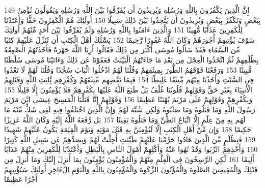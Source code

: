 {\tiny\colorbox{cl_aya}{149}} إِنَّ الَّذِينَ يَكْفُرُونَ بِاللَّهِ وَرُسُلِهِ وَيُرِيدُونَ أَن يُفَرِّقُوا بَيْنَ اللَّهِ وَرُسُلِهِ وَيَقُولُونَ نُؤْمِنُ بِبَعْضٍ وَنَكْفُرُ بِبَعْضٍ وَيُرِيدُونَ أَن يَتَّخِذُوا بَيْنَ ذَلِكَ سَبِيلًا
{\tiny\colorbox{cl_aya}{150}} أُولَئِكَ هُمُ الْكَفِرُونَ حَقًّا وَأَعْتَدْنَا لِلْكَفِرِينَ عَذَابًا مُّهِينًا
{\tiny\colorbox{cl_aya}{151}} وَالَّذِينَ ءَامَنُوا بِاللَّهِ وَرُسُلِهِ وَلَمْ يُفَرِّقُوا بَيْنَ أَحَدٍ مِّنْهُمْ أُولَئِكَ سَوْفَ يُؤْتِيهِمْ أُجُورَهُمْ وَكَانَ اللَّهُ غَفُورًا رَّحِيمًا
{\tiny\colorbox{cl_aya}{152}} يَسَْٔلُكَ أَهْلُ الْكِتَبِ أَن تُنَزِّلَ عَلَيْهِمْ كِتَبًا مِّنَ السَّمَاءِ فَقَدْ سَأَلُوا مُوسَى أَكْبَرَ مِن ذَلِكَ فَقَالُوا أَرِنَا اللَّهَ جَهْرَةً فَأَخَذَتْهُمُ الصَّعِقَةُ بِظُلْمِهِمْ ثُمَّ اتَّخَذُوا الْعِجْلَ مِن بَعْدِ مَا جَاءَتْهُمُ الْبَيِّنَتُ فَعَفَوْنَا عَن ذَلِكَ وَءَاتَيْنَا مُوسَى سُلْطَنًا مُّبِينًا
{\tiny\colorbox{cl_aya}{153}} وَرَفَعْنَا فَوْقَهُمُ الطُّورَ بِمِيثَقِهِمْ وَقُلْنَا لَهُمُ ادْخُلُوا الْبَابَ سُجَّدًا وَقُلْنَا لَهُمْ لَا تَعْدُوا فِى السَّبْتِ وَأَخَذْنَا مِنْهُم مِّيثَقًا غَلِيظًا
{\tiny\colorbox{cl_aya}{154}} فَبِمَا نَقْضِهِم مِّيثَقَهُمْ وَكُفْرِهِم بَِٔايَتِ اللَّهِ وَقَتْلِهِمُ الْأَنبِيَاءَ بِغَيْرِ حَقٍّ وَقَوْلِهِمْ قُلُوبُنَا غُلْفٌ بَلْ طَبَعَ اللَّهُ عَلَيْهَا بِكُفْرِهِمْ فَلَا يُؤْمِنُونَ إِلَّا قَلِيلًا
{\tiny\colorbox{cl_aya}{155}} وَبِكُفْرِهِمْ وَقَوْلِهِمْ عَلَى مَرْيَمَ بُهْتَنًا عَظِيمًا
{\tiny\colorbox{cl_aya}{156}} وَقَوْلِهِمْ إِنَّا قَتَلْنَا الْمَسِيحَ عِيسَى ابْنَ مَرْيَمَ رَسُولَ اللَّهِ وَمَا قَتَلُوهُ وَمَا صَلَبُوهُ وَلَكِن شُبِّهَ لَهُمْ وَإِنَّ الَّذِينَ اخْتَلَفُوا فِيهِ لَفِى شَكٍّ مِّنْهُ مَا لَهُم بِهِ مِنْ عِلْمٍ إِلَّا اتِّبَاعَ الظَّنِّ وَمَا قَتَلُوهُ يَقِينًا
{\tiny\colorbox{cl_aya}{157}} بَل رَّفَعَهُ اللَّهُ إِلَيْهِ وَكَانَ اللَّهُ عَزِيزًا حَكِيمًا
{\tiny\colorbox{cl_aya}{158}} وَإِن مِّنْ أَهْلِ الْكِتَبِ إِلَّا لَيُؤْمِنَنَّ بِهِ قَبْلَ مَوْتِهِ وَيَوْمَ الْقِيَمَةِ يَكُونُ عَلَيْهِمْ شَهِيدًا
{\tiny\colorbox{cl_aya}{159}} فَبِظُلْمٍ مِّنَ الَّذِينَ هَادُوا حَرَّمْنَا عَلَيْهِمْ طَيِّبَتٍ أُحِلَّتْ لَهُمْ وَبِصَدِّهِمْ عَن سَبِيلِ اللَّهِ كَثِيرًا
{\tiny\colorbox{cl_aya}{160}} وَأَخْذِهِمُ الرِّبَوا وَقَدْ نُهُوا عَنْهُ وَأَكْلِهِمْ أَمْوَلَ النَّاسِ بِالْبَطِلِ وَأَعْتَدْنَا لِلْكَفِرِينَ مِنْهُمْ عَذَابًا أَلِيمًا
{\tiny\colorbox{cl_aya}{161}} لَّكِنِ الرَّسِخُونَ فِى الْعِلْمِ مِنْهُمْ وَالْمُؤْمِنُونَ يُؤْمِنُونَ بِمَا أُنزِلَ إِلَيْكَ وَمَا أُنزِلَ مِن قَبْلِكَ وَالْمُقِيمِينَ الصَّلَوةَ وَالْمُؤْتُونَ الزَّكَوةَ وَالْمُؤْمِنُونَ بِاللَّهِ وَالْيَوْمِ الْءَاخِرِ أُولَئِكَ سَنُؤْتِيهِمْ أَجْرًا عَظِيمًا
